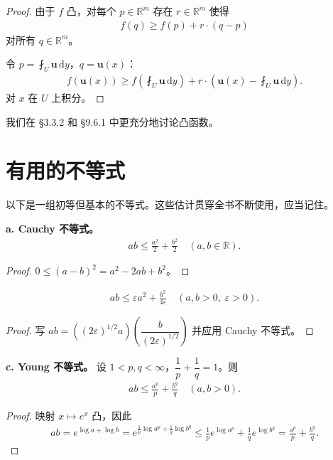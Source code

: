 \documentclass[../main.tex]{subfiles}
\begin{document}
\begin{proof}
由于 $f$ 凸，对每个 $p\in\mathbb{R}^m$ 存在 $r\in\mathbb{R}^m$ 使得
\begin{align*}
f(q)\geqslant f(p)+r\cdot(q-p)
\end{align*}
对所有 $q\in\mathbb{R}^m$。

令 $p=\fint_U\mathbf{u}\,\mathrm{d}y$，$q=\mathbf{u}(x)$：
\begin{align*}
f(\mathbf{u}(x))\geqslant f\left(\fint_U\mathbf{u}\,\mathrm{d}y\right)+r\cdot\left(\mathbf{u}(x)-\fint_U\mathbf{u}\,\mathrm{d}y\right).
\end{align*}
对 $x$ 在 $U$ 上积分。
\end{proof}

我们在 \S3.3.2 和 \S9.6.1 中更充分地讨论凸函数。

\section{有用的不等式}\label{section:appB-有用不等式}

以下是一组初等但基本的不等式。这些估计贯穿全书不断使用，应当记住。

\textbf{a. Cauchy 不等式。}
\begin{align}
ab\leqslant\frac{a^2}{2}+\frac{b^2}{2} \quad (a,b\in\mathbb{R}).
\label{align:appB-Cauchy}
\end{align}
\begin{proof}
$0\leqslant(a-b)^2=a^2-2ab+b^2$。
\end{proof}

\begin{theorem}\label{theorem:带参的Cauchy不等式}
\begin{align}
ab\leqslant\varepsilon a^2+\frac{b^2}{4\varepsilon} \quad (a,b>0,\;\varepsilon>0).
\label{align:appB-CauchyEps}
\end{align}
\end{theorem}
\begin{proof}
写 $ab=((2\varepsilon)^{1/2}a)\left(\dfrac{b}{(2\varepsilon)^{1/2}}\right)$ 并应用 Cauchy 不等式。
\end{proof}

\textbf{c. Young 不等式。} 设 $1<p,q<\infty$，$\dfrac{1}{p}+\dfrac{1}{q}=1$。则
\begin{align}
ab\leqslant\frac{a^p}{p}+\frac{b^q}{q} \quad (a,b>0).
\label{align:appB-Young}
\end{align}
\begin{proof}
映射 $x\mapsto e^x$ 凸，因此
\begin{align*}
ab=e^{\log a+\log b}=e^{\frac{1}{p}\log a^p+\frac{1}{q}\log b^q}\leqslant\frac{1}{p}e^{\log a^p}+\frac{1}{q}e^{\log b^q}=\frac{a^p}{p}+\frac{b^q}{q}.
\end{align*}
\end{proof}
\end{document}

